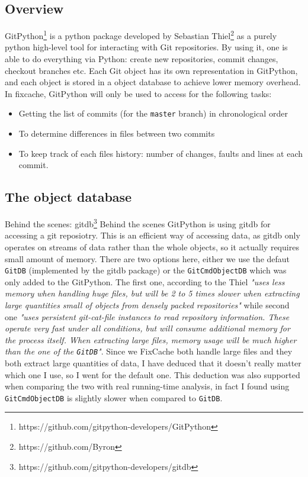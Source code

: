 \documentclass[12pt,twoside,notitlepage]{report}
\newcommand{\fxch}{FixCache }
\begin{document}
\subsection{Overview}
GitPython\footnote{https://github.com/gitpython-developers/GitPython} is a python package developed by Sebastian Thiel\footnote{https://github.com/Byron} as a purely python high-level tool for interacting with Git repositories. By using it, one is able to do everything via Python: create new repositories, commit changes, checkout branches etc. Each Git object has its own representation in GitPython, and each object is stored in a object database to achieve lower memory overhead. In fixcache, GitPython will only be used to access for the following tasks:
\begin{itemize}
\item Getting the list of commits (for the \texttt{master} branch) in chronological order
\item To determine differences in files between two commits
\item To keep track of each files history: number of changes, faults and lines at each commit.
\end{itemize}
\subsection{The object database}
Behind the scenes: gitdb\footnote{https://github.com/gitpython-developers/gitdb}
Behind the scenes GitPython is using gitdb for accessing a git reposiotry. This is an efficient way of accessing data, as gitdb only operates on streams of data rather than the whole objects, so it actually requires small amount of memory. There are two options here, either we use the defaut \texttt{GitDB} (implemented by the gitdb package) or the \texttt{GitCmdObjectDB} which was only added to the GitPython. The first one, according to the Thiel \textit{"uses less memory when handling huge files, but will be 2 to 5 times slower when extracting large quantities
small of objects from densely packed repositories"} while second one \textit{"uses persistent git-cat-file instances to read repository information. These operate very fast
under all conditions, but will consume additional memory for the process itself. When extracting large files, memory
usage will be much higher than the one of the \texttt{GitDB}"}. Since we \fxch both handle large files and they both extract large quantities of data, I have deduced that it doesn't really matter which one I use, so I went for the default one. This deduction was also supported when comparing the two with real running-time analysis, in fact I found using \texttt{GitCmdObjectDB} is slightly slower when compared to \texttt{GitDB}.
\cleardoublepage
\end{document}
